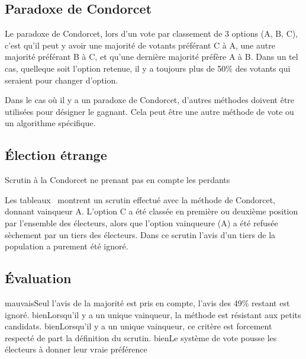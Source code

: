 \documentclass[../report]{subfiles}
\begin{document}
  \subsection{Paradoxe de Condorcet}

  Le paradoxe de Condorcet, lors d'un vote par classement de 3 options (A, B, C),
  c'est qu'il peut y avoir une majorité de votants préférant C à A, une autre majorité 
  préférant B à C, et qu'une dernière majorité préfère A à B.
  Dans un tel cas, quelleque soit l'option retenue, il y a toujours plus de 50\% des votants
  qui seraient pour changer d'option.

  Dans le cas où il y a un paradoxe de Condorcet, d'autres méthodes doivent être utilisées pour désigner
  le gagnant.
  Cela peut être une autre méthode de vote ou un algorithme spécifique.
  \subsection{Élection étrange}
  \begin{table}[h]
    \begin{center}
      \caption{Scrutin à la Condorcet ne prenant pas en compte les perdants}%
      \label{fig:diff:condorcet:caslim1}
    \end{center}
  \end{table}

  Les tableaux~ montrent un scrutin effectué avec la méthode de Condorcet,
  donnant vainqueur A.
  L'option C a été classée en première ou deuxième position par l'ensemble des électeurs, alors que l'option
  vainqueure (A) a été refusée sèchement par un tiers des électeurs.
  Dans ce scrutin l'avis d'un tiers de la population a purement été ignoré.

  \subsection{Évaluation}
  \tabcritere%
    {mauvais}{Seul l'avis de la majorité est pris en compte, l'avis des 49\% restant est ignoré.}%
    {bien}{Lorsqu'il y a un unique vainqueur, la méthode est résistant aux petits candidats.}%
    {bien}{Lorsqu'il y a un unique vainqueur, ce critère est forcement respecté de part la définition du scrutin.}%
    {bien}{Le système de vote pousse les électeurs à donner leur vraie préférence}
\end{document}
